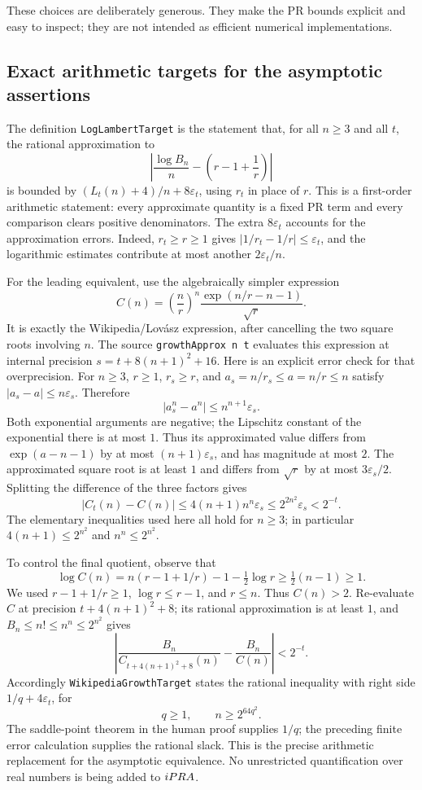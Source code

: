 These choices are deliberately generous. They make the PR bounds explicit
and easy to inspect; they are not intended as efficient numerical
implementations.

\subsection{Exact arithmetic targets for the asymptotic assertions}

The definition \texttt{LogLambertTarget} is the statement that, for all
$n\ge3$ and all $t$, the rational approximation to
\[
 \left|\frac{\log B_n}{n}-
 \left(r-1+\frac1r\right)\right|
\]
is bounded by $(L_t(n)+4)/n+8\varepsilon_t$, using $r_t$ in place of $r$.
This is a first-order arithmetic statement: every approximate quantity is
a fixed PR term and every comparison clears positive denominators. The
extra $8\varepsilon_t$ accounts for the approximation errors. Indeed,
$r_t\ge r\ge1$ gives
$|1/r_t-1/r|\le\varepsilon_t$, and the logarithmic estimates contribute
at most another $2\varepsilon_t/n$.

For the leading equivalent, use the algebraically simpler expression
\[
 C(n)=\left(\frac nr\right)^n
       \frac{\exp(n/r-n-1)}{\sqrt r}.
\]
It is exactly the Wikipedia/Lov\'asz expression, after cancelling the two
square roots involving $n$. The source \texttt{growthApprox n t} evaluates
this expression at internal precision
$s=t+8(n+1)^2+16$.
Here is an explicit error check for that overprecision. For $n\ge3$,
$r\ge1$, $r_s\ge r$, and $a_s=n/r_s\le a=n/r\le n$ satisfy
$|a_s-a|\le n\varepsilon_s$. Therefore
\[
 |a_s^n-a^n|\le n^{n+1}\varepsilon_s.
\]
Both exponential arguments are negative; the Lipschitz constant of the
exponential there is at most $1$. Thus its approximated value differs
from $\exp(a-n-1)$ by at most $(n+1)\varepsilon_s$, and has magnitude at
most $2$. The approximated square root is at least $1$ and differs from
$\sqrt r$ by at most $3\varepsilon_s/2$. Splitting the difference of the
three factors gives
\[
 |C_t(n)-C(n)|
 \le4(n+1)n^n\varepsilon_s
 \le2^{2n^2}\varepsilon_s
 <2^{-t}.
\]
The elementary inequalities used here all hold for $n\ge3$; in particular
$4(n+1)\le2^{n^2}$ and $n^n\le2^{n^2}$.

To control the final quotient, observe that
\[
 \log C(n)=n(r-1+1/r)-1-\tfrac12\log r
 \ge\tfrac12(n-1)\ge1.
\]
We used $r-1+1/r\ge1$, $\log r\le r-1$, and $r\le n$.
Thus $C(n)>2$. Re-evaluate $C$ at precision
$t+4(n+1)^2+8$; its rational approximation is at least $1$, and
$B_n\le n!\le n^n\le2^{n^2}$ gives
\[
 \left|\frac{B_n}{C_{t+4(n+1)^2+8}(n)}-
              \frac{B_n}{C(n)}\right|<2^{-t}.
\]
Accordingly \texttt{WikipediaGrowthTarget} states the rational inequality
with right side $1/q+4\varepsilon_t$, for
\[
 q\ge1,\qquad n\ge2^{64q^2}.
\]
The saddle-point theorem in the human proof supplies $1/q$; the preceding
finite error calculation supplies the rational slack. This is the precise
arithmetic replacement for the asymptotic equivalence. No unrestricted
quantification over real numbers is being added to $iPRA$.

